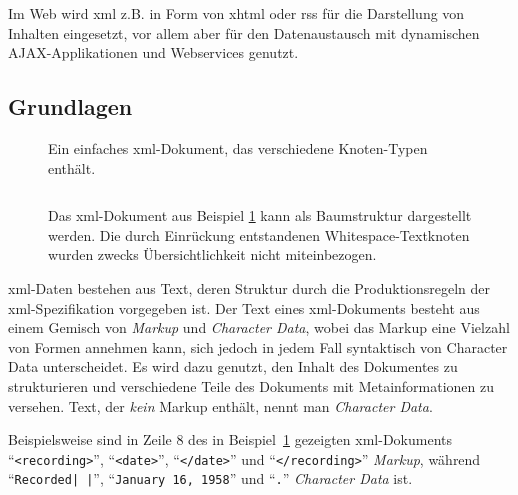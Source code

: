 Im Web wird \acrshort{xml} z.B. in Form von \acrshort{xhtml} oder \gls{rss} für die Darstellung von Inhalten eingesetzt, vor allem aber für den Datenaustausch mit dynamischen AJAX-Applikationen und Webservices genutzt.

\subsection{Grundlagen}
\label{sec:xmlbasics}

\begin{figure}[h!]
    \begin{example}
        Ein  einfaches \acrshort{xml}-Dokument, das verschiedene Knoten-Typen enthält.
        \label{ex:xmldoc}
        \inputminted{xml}{xmltree.xml}
        \end{example}
\end{figure}

\begin{figure}[b!]
    \begin{example}
        Das \acrshort{xml}-Dokument aus Beispiel \ref{ex:xmldoc} kann als Baumstruktur dargestellt werden. Die durch Einrückung entstandenen Whitespace-Textknoten wurden zwecks Übersichtlichkeit nicht miteinbezogen.
        \begin{center}
            
        \end{center}
        \label{ex:xmltree}
    \end{example}
\end{figure}

\acrshort{xml}-Daten bestehen aus Text, deren Struktur durch die Produktionsregeln der \acrshort{xml}-Spezifikation vorgegeben ist. Der Text eines \acrshort{xml}-Dokuments besteht aus einem Gemisch von \emph{Markup} und \emph{Character Data}, wobei das Markup eine Vielzahl von Formen annehmen kann, sich jedoch in jedem Fall syntaktisch von Character Data unterscheidet. Es wird dazu genutzt, den Inhalt des Dokumentes zu strukturieren und verschiedene Teile des Dokuments mit Metainformationen zu versehen. Text, der \emph{kein} Markup enthält, nennt man \emph{Character Data}.

Beispielsweise sind in Zeile 8 des in Beispiel~\ref{ex:xmldoc} gezeigten \acrshort{xml}-Dokuments \linebreak{}\enquote{\texttt{<recording>}}, \enquote{\texttt{<date>}}, \enquote{\texttt{</date>}} und \enquote{\texttt{</recording>}} \emph{Markup}, während \linebreak{}\enquote{\texttt{Recorded| |}}, \enquote{\texttt{January 16, 1958}} und \enquote{\texttt{.}} \emph{Character Data} ist.

